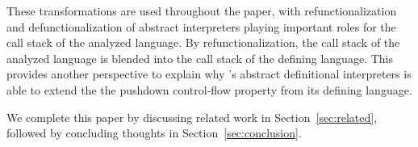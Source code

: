 \documentclass[acmsmall,review,anonymous]{acmart}\settopmatter{printfolios=true,printccs=false,printacmref=false}
\begin{document}
These transformations are used throughout the paper, with refunctionalization and
defunctionalization of abstract interpreters playing important roles for the call stack of
the analyzed language. By refunctionalization, the call stack of the analyzed language
is blended into the call stack of the defining language. This provides another perspective to
explain why \citeauthor{darais2017abstracting}'s abstract definitional interpreters
is able to extend the the pushdown control-flow property from its defining language.

We complete this paper by discussing related work in Section~\ref{sec:related}, followed by concluding thoughts in Section~\ref{sec:conclusion}.






\end{document}
